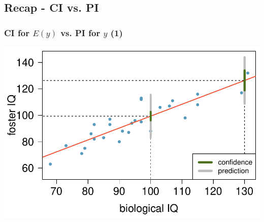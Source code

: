 \documentclass[11pt,containsverbatim,handout,xcolor=xelatex,dvipsnames,table]{beamer}
\newcommand{\soln}[1]{}
\begin{document}

\begin{frame}[fragile]
\frametitle{}

\vfill


\vfill

\soln{
\pause
We already found that $\hat{y} \approx 99.35$ and $t_{25}^\star = 2.06$. 
\begin{eqnarray*}
ME &=& 2.06 \times 7.729 \times \sqrt{1 + \frac{1}{27} + \frac{(100 - 95.3)^2}{26 \times 15.74^2}} \approx 16.24 \\ \pause
CI &=& 99.35 \pm 16.24 \\ \pause
&=& (83.11, 115.59)
\end{eqnarray*}
}

\end{frame}


\subsection{Recap - CI vs. PI}


\begin{frame}
\frametitle{CI for $E(y)$ vs. PI for $y$ (1)}

\begin{center}
\includegraphics[width=\textwidth]{figures/twins/twins_IQ_100cintpint_130cintpint}
\end{center}

\end{frame}
\end{document}
